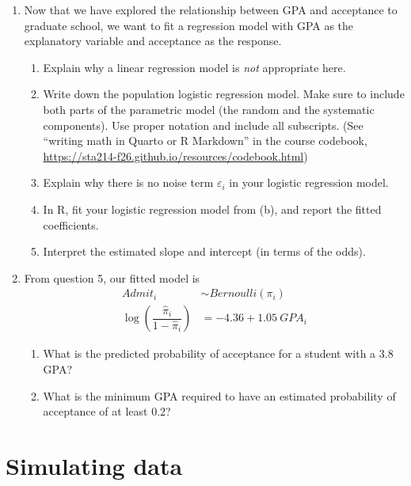 \documentclass[11pt]{article}
\begin{document}
\begin{enumerate}
\item[5.] Now that we have explored the relationship between GPA and acceptance to graduate school, we want to fit a regression model with GPA as the explanatory variable and acceptance as the response.

\begin{enumerate}
\item Explain why a linear regression model is \textit{not} appropriate here.

\item Write down the population logistic regression model. Make sure to include both parts of the parametric model (the random and the systematic components). Use proper notation and include all subscripts. (See ``writing math in Quarto or R Markdown'' in the course codebook, \url{https://sta214-f26.github.io/resources/codebook.html})

\item Explain why there is no noise term $\varepsilon_i$ in your logistic regression model.

\item In R, fit your logistic regression model from (b), and report the fitted coefficients.

\item Interpret the estimated slope and intercept (in terms of the odds).
\end{enumerate}

\item[6.] From question 5, our fitted model is
\begin{align*}
Admit_i &\sim Bernoulli(\pi_i) \\
\log \left( \dfrac{\widehat{\pi}_i}{1 - \widehat{\pi}_i} \right) &= -4.36 + 1.05 \ GPA_i
\end{align*}

\begin{enumerate}
\item What is the predicted probability of acceptance for a student with a 3.8 GPA?

\item What is the minimum GPA required to have an estimated probability of acceptance of at least 0.2?
\end{enumerate}
\end{enumerate}

\section{Simulating data}
\end{document}
